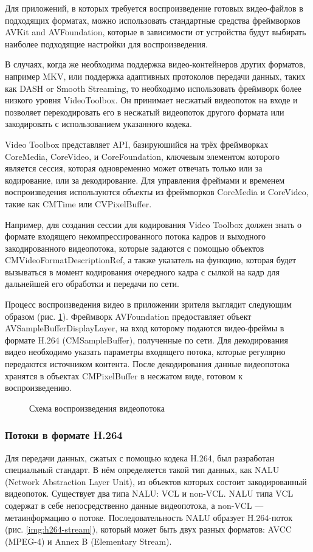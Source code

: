 			Для приложений, в которых требуется воспроизведение готовых видео-файлов в подходящих форматах, можно
			использовать стандартные средства фреймворков AVKit and AVFoundation, которые в зависимости от устройства
			будут выбирать наиболее подходящие настройки для воспроизведения.

			В случаях, когда же необходима поддержка видео-контейнеров других форматов, например MKV, или поддержка
			адаптивных протоколов передачи данных, таких как DASH or Smooth Streaming, то необходимо использовать
			фреймворк более низкого уровня VideoToolbox. Он принимает несжатый видеопоток на входе и позволяет
			перекодировать его в несжатый видеопоток другого формата или закодировать с использованием указанного кодека.

			Video Toolbox представляет API, базируюшийся на трёх фреймворках CoreMedia, CoreVideo, и CoreFoundation,
			ключевым элементом которого является сессия, которая одновременно может отвечать только или за кодирование,
			или за декодирование. Для управления фреймами и временем воспроизведения используются объекты из фреймворков
			CoreMedia и CoreVideo, такие как CMTime или CVPixelBuffer.

			Например, для создания сессии для кодирования Video Toolbox должен знать о формате входящего
			некомпрессированного потока кадров и выходного закодированного видеопотока, которые задаются с помощью
			объектов CMVideoFormatDescriptionRef, а также указатель на функцию, которая будет вызываться в
			момент кодирования очередного кадра с сылкой на кадр для дальнейшей его обработки и передачи по сети.

			Процесс воспроизведения видео в приложении зрителя выглядит следующим образом (рис.
			\ref{img:play-video-frames}). Фреймворк AVFoundation предоставляет объект
			AVSampleBufferDisplayLayer, на вход которому подаются видео-фреймы в формате H.264
			(CMSampleBuffer), полученные по сети. Для декодирования видео необходимо указать параметры
			входящего потока, которые регулярно передаются источником контента. После декодирования данные видеопотока
			хранятся в объектах CMPixelBuffer в несжатом виде, готовом к воспроизведению.

			\begin{figure}[h]
				\caption{Схема воспроизведения видеопотока}
				\label{img:play-video-frames}
			\end{figure}

			\subsubsection{Потоки в формате H.264}
			Для передачи данных, сжатых с помощью кодека H.264, был разработан специальный стандарт. В нём определяется
			такой тип данных, как NALU (Network Abstraction Layer Unit), из объектов которых состоит закодированный
			видеопоток. Существует два типа NALU: VCL и non-VCL. NALU типа VCL содержат в себе непосредственно данные
			видеопотока, а non-VCL --- метаинформацию о потоке. Последовательность NALU образует H.264-поток
			(рис. \ref{img:h264-stream}), который может быть двух разных форматов: AVCC (MPEG-4) и Annex B (Elementary
			Stream).

